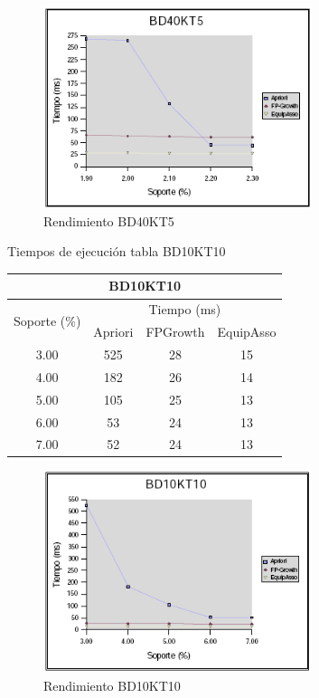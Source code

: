 \begin{figure}[h]
\centering
\includegraphics[width=0.7\textwidth]{images/bd40kt5.png}
\caption{Rendimiento BD40KT5}
\label{40k1}
\end{figure}

\newpage

\begin{table}[h]
\caption{Tiempos de ejecuci\'on tabla BD10KT10}
\end{table}
\begin{center}
\begin{tabular}{|*{4}{c|}} \hline
\multicolumn{4}{|c|}{\textbf{BD10KT10}}\\ \hline\hline
\multirow{2}{*}{Soporte (\%)} & \multicolumn{3}{|c|}{Tiempo (ms)}\\ \cline{2-4}
     & Apriori & FPGrowth & EquipAsso\\ \hline
3.00 & 525 & 28 & 15\\ \hline
4.00 & 182 & 26 & 14\\ \hline
5.00 & 105 & 25 & 13\\ \hline
6.00 &  53 & 24 & 13\\ \hline
7.00 &  52 & 24 & 13\\ \hline
\end{tabular}
\end{center}

\begin{figure}[h]
\centering
\includegraphics[width=0.7\textwidth]{images/bd10kt10.png}
\caption{Rendimiento BD10KT10}
\label{10k1}
\end{figure}

